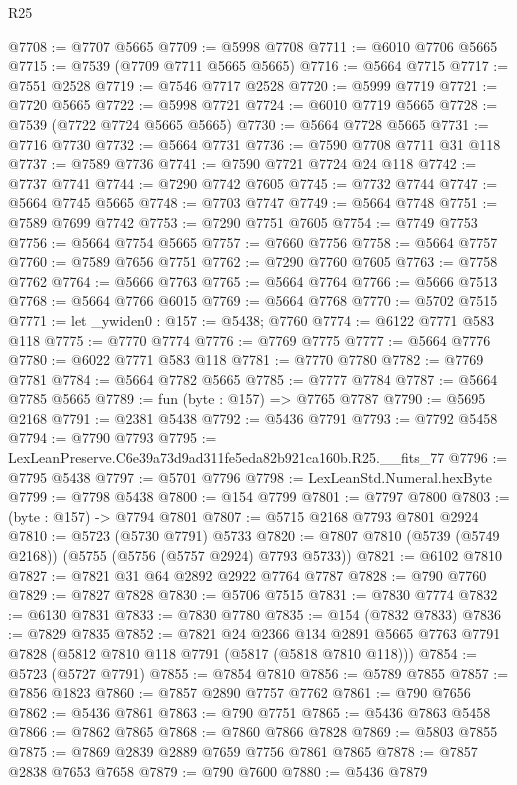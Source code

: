 \begin{lexlean}{R25}
\begin{coremodule}
@7708 := @7707 @5665
@7709 := @5998 @7708
@7711 := @6010 @7706 @5665
@7715 := @7539 (@7709 @7711 @5665 @5665)
@7716 := @5664 @7715
@7717 := @7551 @2528
@7719 := @7546 @7717 @2528
@7720 := @5999 @7719
@7721 := @7720 @5665
@7722 := @5998 @7721
@7724 := @6010 @7719 @5665
@7728 := @7539 (@7722 @7724 @5665 @5665)
@7730 := @5664 @7728 @5665
@7731 := @7716 @7730
@7732 := @5664 @7731
@7736 := @7590 @7708 @7711 @31 @118
@7737 := @7589 @7736
@7741 := @7590 @7721 @7724 @24 @118
@7742 := @7737 @7741
@7744 := @7290 @7742 @7605
@7745 := @7732 @7744
@7747 := @5664 @7745 @5665
@7748 := @7703 @7747
@7749 := @5664 @7748
@7751 := @7589 @7699 @7742
@7753 := @7290 @7751 @7605
@7754 := @7749 @7753
@7756 := @5664 @7754 @5665
@7757 := @7660 @7756
@7758 := @5664 @7757
@7760 := @7589 @7656 @7751
@7762 := @7290 @7760 @7605
@7763 := @7758 @7762
@7764 := @5666 @7763
@7765 := @5664 @7764
@7766 := @5666 @7513
@7768 := @5664 @7766 @6015
@7769 := @5664 @7768
@7770 := @5702 @7515
@7771 := let _ywiden0 : @157 := @5438; @7760
@7774 := @6122 @7771 @583 @118
@7775 := @7770 @7774
@7776 := @7769 @7775
@7777 := @5664 @7776
@7780 := @6022 @7771 @583 @118
@7781 := @7770 @7780
@7782 := @7769 @7781
@7784 := @5664 @7782 @5665
@7785 := @7777 @7784
@7787 := @5664 @7785 @5665
@7789 := fun (byte : @157) => @7765 @7787
@7790 := @5695 @2168
@7791 := @2381 @5438
@7792 := @5436 @7791
@7793 := @7792 @5458
@7794 := @7790 @7793
@7795 := LexLeanPreserve.C6e39a73d9ad311fe5eda82b921ca160b.R25.__fits_77
@7796 := @7795 @5438
@7797 := @5701 @7796
@7798 := LexLeanStd.Numeral.hexByte
@7799 := @7798 @5438
@7800 := @154 @7799
@7801 := @7797 @7800
@7803 := (byte : @157) -> @7794 @7801
@7807 := @5715 @2168 @7793 @7801 @2924
@7810 := @5723 (@5730 @7791) @5733
@7820 := @7807 @7810 (@5739 (@5749 @2168)) (@5755 (@5756 (@5757 @2924) @7793 @5733))
@7821 := @6102 @7810
@7827 := @7821 @31 @64 @2892 @2922 @7764 @7787
@7828 := @790 @7760
@7829 := @7827 @7828
@7830 := @5706 @7515
@7831 := @7830 @7774
@7832 := @6130 @7831
@7833 := @7830 @7780
@7835 := @154 (@7832 @7833)
@7836 := @7829 @7835
@7852 := @7821
    @24
    @2366
    @134
    @2891
    @5665
    @7763
    @7791
    @7828
    (@5812 @7810 @118 @7791 (@5817 (@5818 @7810 @118)))
@7854 := @5723 (@5727 @7791)
@7855 := @7854 @7810
@7856 := @5789 @7855
@7857 := @7856 @1823
@7860 := @7857 @2890 @7757 @7762
@7861 := @790 @7656
@7862 := @5436 @7861
@7863 := @790 @7751
@7865 := @5436 @7863 @5458
@7866 := @7862 @7865
@7868 := @7860 @7866 @7828
@7869 := @5803 @7855
@7875 := @7869 @2839 @2889 @7659 @7756 @7861 @7865
@7878 := @7857 @2838 @7653 @7658
@7879 := @790 @7600
@7880 := @5436 @7879

\end{coremodule}
\end{lexlean}

